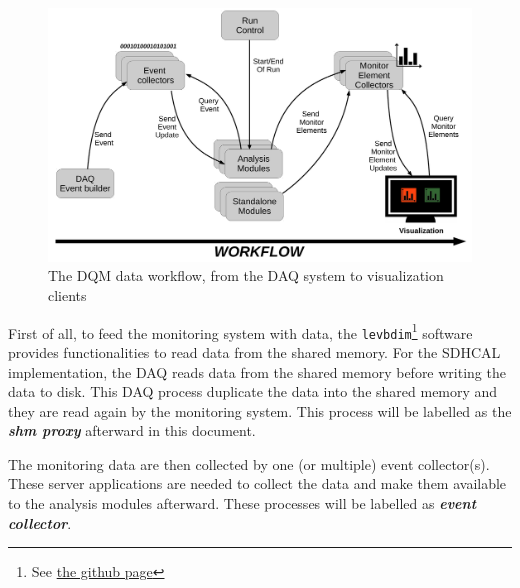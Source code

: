 \documentclass[12pt]{article}
\begin{document}
\begin{figure}[!ht]
  \begin{center}
    \includegraphics[width=\linewidth]{DQM4HEP_workflow.pdf}
  \end{center}
  \caption{\label{DQM4HEP_WORKFLOW} The DQM data workflow, from the DAQ system to visualization clients}
\end{figure}

First of all, to feed the monitoring system with data, the \verb?levbdim?\footnote{See \href{https://github.com/DQM4HEP/levbdim}{the github page}} software provides functionalities to read data from the shared memory. For the SDHCAL implementation, the DAQ reads data from the shared memory before writing the data to disk. This DAQ process duplicate the data into the shared memory and they are read again by the monitoring system. This process will be labelled as the \textit{\bf shm proxy} afterward in this document.

The monitoring data are then collected by one (or multiple) event collector(s). These server applications are needed to collect the data and make them available to the analysis modules afterward. These processes will be labelled as \textit{\bf event collector}.
\end{document}
